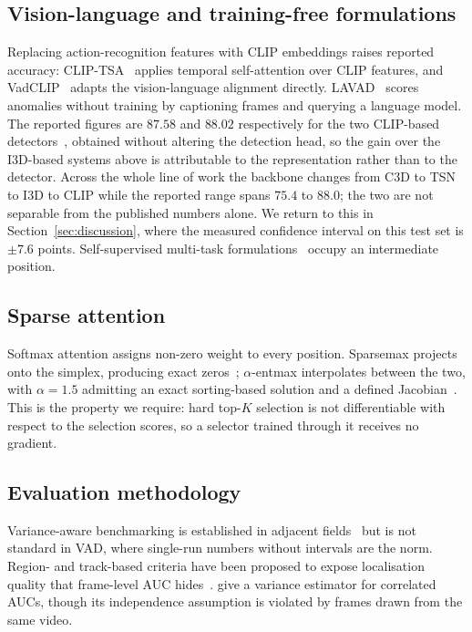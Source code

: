 \documentclass[11pt]{article}
\begin{document}
\subsection{Vision-language and training-free formulations}
Replacing action-recognition features with CLIP embeddings raises reported
accuracy: CLIP-TSA~\citep{joo2023clip} applies temporal self-attention over CLIP
features, and VadCLIP~\citep{wu2024vadclip} adapts the vision-language alignment
directly. LAVAD~\citep{zanella2024harnessing} scores anomalies without training
by captioning frames and querying a language model. The reported figures are
$87.58$ and $88.02$ respectively for the two CLIP-based
detectors~\citep{joo2023clip,wu2024vadclip}, obtained without altering the
detection head, so the gain over the I3D-based systems above is attributable to
the representation rather than to the detector. Across the whole line of work the
backbone changes from C3D to TSN to I3D to CLIP while the reported range spans
$75.4$ to $88.0$; the two are not separable from the published numbers alone. We
return to this in Section~\ref{sec:discussion}, where the measured confidence
interval on this test set is $\pm7.6$ points. Self-supervised multi-task
formulations~\citep{georgescu2021anomaly} occupy an intermediate position.

\subsection{Sparse attention}
Softmax attention assigns non-zero weight to every position. Sparsemax
projects onto the simplex, producing exact zeros~\citep{martins2016softmax};
$\alpha$-entmax interpolates between the two, with $\alpha=1.5$ admitting an
exact sorting-based solution and a defined Jacobian~\citep{peters2019sparse}.
This is the property we require: hard top-$K$ selection is not differentiable
with respect to the selection scores, so a selector trained through it receives
no gradient.

\subsection{Evaluation methodology}
Variance-aware benchmarking is established in adjacent
fields~\citep{reimers2017reporting,bouthillier2021accounting} but is not standard
in VAD, where single-run numbers without intervals are the norm. Region- and
track-based criteria have been proposed to expose localisation quality that
frame-level AUC hides~\citep{ramachandra2020street}. \citet{delong1988comparing}
give a variance estimator for correlated AUCs, though its independence assumption
is violated by frames drawn from the same video.
\end{document}
